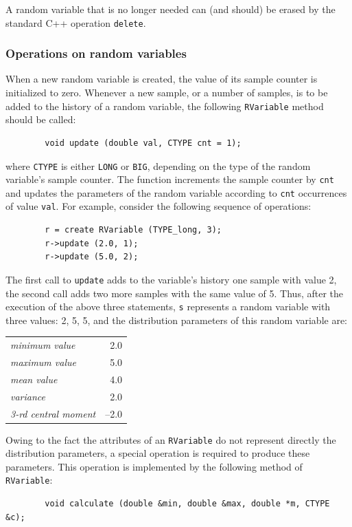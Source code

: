 A random variable that is no longer needed can (and should) be erased by
the standard C++ operation {\tt delete}.

\subsubsection{Operations on random variables}
\label{rm_pm_rv_op}

When a new random variable is created, the value of its sample counter
is initialized to zero.
Whenever a new sample, or a number of samples,
is to be added to the history of a random variable,
the following {\tt RVariable} method should be called:
\begin{verbatim}
        void update (double val, CTYPE cnt = 1);
\end{verbatim}
where {\tt CTYPE} is either {\tt LONG} or {\tt BIG}, depending on the type
of the random variable's sample counter.
The function increments the sample counter by {\tt cnt}
and updates the
parameters of the random variable according to {\tt cnt} occurrences of
value {\tt val}.
For example, consider the following sequence of
operations:
\begin{verbatim}
        r = create RVariable (TYPE_long, 3);
        r->update (2.0, 1);
        r->update (5.0, 2);
\end{verbatim}

The first call to {\tt update} adds to the variable's history
one sample with value 2, the second call adds two more samples
with the same value of 5.
Thus, after the execution of the above three statements, {\tt s}
represents a random variable with three values: 2, 5, 5, and
the distribution parameters of this random variable are:

\begin{center}
\begin{tabular}{l r}
{\em minimum value} & 2.0 \\
{\em maximum value} & 5.0 \\
{\em mean value} & 4.0 \\
{\em variance} & 2.0 \\
{\em 3-rd central moment} & --2.0 
\end{tabular}
\end{center}

Owing to the fact the attributes of an {\tt RVariable} do not represent
directly the distribution parameters, a special operation is required
to produce these parameters.
This operation is implemented by the following method of {\tt RVariable}:
\begin{verbatim}
        void calculate (double &min, double &max, double *m, CTYPE &c);
\end{verbatim}

